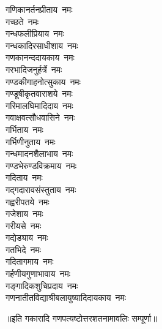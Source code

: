 \begin{flushleft}
\begin{multicols}{2}
गणिकानर्तनप्रीताय~नमः\\
गच्छते~नमः\\
गन्धफलीप्रियाय~नमः\\
गन्धकादिरसाधीशाय~नमः\\
गणकानन्ददायकाय~नमः\\
गरभादिजनुर्हर्त्रे~नमः\\
गण्डकीगाहनोत्सुकाय~नमः\hfill{}\\
गण्डूषीकृतवाराशये~नमः\\
गरिमालघिमादिदाय~नमः\\
गवाक्षवत्सौधवासिने~नमः\\
गर्भिताय~नमः\\
गर्भिणीनुताय~नमः\\
गन्धमादनशैलाभाय~नमः\\
गण्डभेरुण्डविक्रमाय~नमः\\
गदिताय~नमः\\
गद्गदारावसंस्तुताय~नमः\\
गह्वरीपतये~नमः\hfill{}\\
गजेशाय~नमः\\
गरीयसे~नमः\\
गद्येड्याय~नमः\\
गतभिदे~नमः\\
गदितागमाय~नमः\\
गर्हणीयगुणाभावाय~नमः\\
गङ्गादिकशुचिप्रदाय~नमः\\
गणनातीतविद्याश्री\-बलायुष्यादिदायकाय~नमः\\
\end{multicols}
\end{flushleft}
॥इति गकारादि गणपत्यष्टोत्तरशतनामावलिः सम्पूर्णा॥
